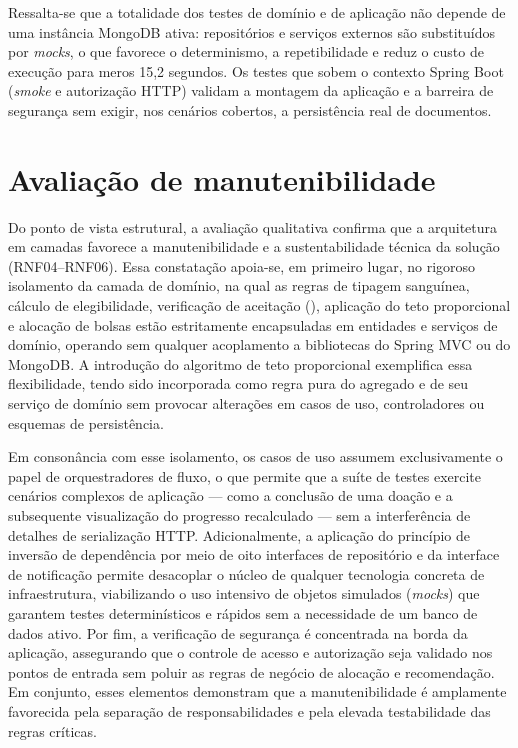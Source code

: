 Ressalta-se que a totalidade dos testes de domínio e de aplicação não depende de uma instância MongoDB ativa: repositórios e serviços externos são substituídos por \textit{mocks}, o que favorece o determinismo, a repetibilidade e reduz o custo de execução para meros 15,2 segundos. Os testes que sobem o contexto Spring Boot (\textit{smoke} e autorização HTTP) validam a montagem da aplicação e a barreira de segurança sem exigir, nos cenários cobertos, a persistência real de documentos.

\section{Avaliação de manutenibilidade}

Do ponto de vista estrutural, a avaliação qualitativa confirma que a arquitetura em camadas favorece a manutenibilidade e a sustentabilidade técnica da solução (RNF04--RNF06). Essa constatação apoia-se, em primeiro lugar, no rigoroso isolamento da camada de domínio, na qual as regras de tipagem sanguínea, cálculo de elegibilidade, verificação de aceitação (), aplicação do teto proporcional e alocação de bolsas estão estritamente encapsuladas em entidades e serviços de domínio, operando sem qualquer acoplamento a bibliotecas do Spring MVC ou do MongoDB. A introdução do algoritmo de teto proporcional exemplifica essa flexibilidade, tendo sido incorporada como regra pura do agregado e de seu serviço de domínio sem provocar alterações em casos de uso, controladores ou esquemas de persistência.

Em consonância com esse isolamento, os casos de uso assumem exclusivamente o papel de orquestradores de fluxo, o que permite que a suíte de testes exercite cenários complexos de aplicação --- como a conclusão de uma doação e a subsequente visualização do progresso recalculado --- sem a interferência de detalhes de serialização HTTP. Adicionalmente, a aplicação do princípio de inversão de dependência por meio de oito interfaces de repositório e da interface de notificação permite desacoplar o núcleo de qualquer tecnologia concreta de infraestrutura, viabilizando o uso intensivo de objetos simulados (\textit{mocks}) que garantem testes determinísticos e rápidos sem a necessidade de um banco de dados ativo. Por fim, a verificação de segurança é concentrada na borda da aplicação, assegurando que o controle de acesso e autorização seja validado nos pontos de entrada sem poluir as regras de negócio de alocação e recomendação. Em conjunto, esses elementos demonstram que a manutenibilidade é amplamente favorecida pela separação de responsabilidades e pela elevada testabilidade das regras críticas.


